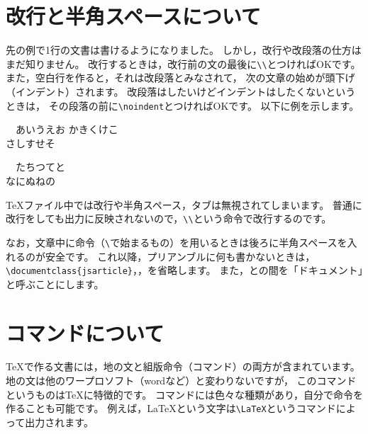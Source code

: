 \section{改行と半角スペースについて}
先の例で1行の文書は書けるようになりました。
しかし，改行や改段落の仕方はまだ知りません。
改行するときは，改行前の文の最後に\verb|\\|とつければOKです。
また，空白行を作ると，それは改段落とみなされて，
次の文章の始めが頭下げ（インデント）されます。
改段落はしたいけどインデントはしたくないというときは，
その段落の前に\verb|\noindent|とつければOKです。
以下に例を示します。

\begin{IOtcb}
\tcblower

　あいうえお
かきくけこ \\
さしすせそ

　たちつてと\\
なにぬねの
\end{IOtcb}

{\TeX}ファイル中では改行や半角スペース，タブは無視されてしまいます。
普通に改行をしても出力に反映されないので，\verb|\\|という命令で改行するのです。


なお，文章中に命令（\verb|\|で始まるもの）を用いるときは後ろに半角スペースを入れるのが安全です。
これ以降，プリアンブルに何も書かないときは，
\verb|\documentclass{jsarticle}|，\verb||，\verb||を省略します。
また，\verb||と\verb||の間を「ドキュメント」と呼ぶことにします。



\section{コマンドについて}
{\TeX}で作る文書には，地の文と組版命令（コマンド）の両方が含まれています。
地の文は他のワープロソフト（wordなど）と変わりないですが，
このコマンドというものは{\TeX}に特徴的です。
コマンドには色々な種類があり，自分で命令を作ることも可能です。
例えば，{\LaTeX}という文字は\verb|\LaTeX|というコマンドによって出力されます。

